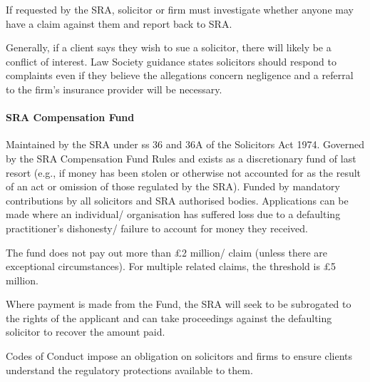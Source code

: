 \documentclass[
]{article}
\begin{document}
If requested by the SRA, solicitor or firm must investigate whether
anyone may have a claim against them and report back to SRA.

Generally, if a client says they wish to sue a solicitor, there will
likely be a conflict of interest. Law Society guidance states solicitors
should respond to complaints even if they believe the allegations
concern negligence and a referral to the firm's insurance provider will
be necessary.

\hypertarget{sra-compensation-fund}{%
\paragraph{SRA Compensation Fund}\label{sra-compensation-fund}}

Maintained by the SRA under ss 36 and 36A of the Solicitors Act 1974.
Governed by the SRA Compensation Fund Rules and exists as a
discretionary fund of last resort (e.g., if money has been stolen or
otherwise not accounted for as the result of an act or omission of those
regulated by the SRA). Funded by mandatory contributions by all
solicitors and SRA authorised bodies. Applications can be made where an
individual/ organisation has suffered loss due to a defaulting
practitioner's dishonesty/ failure to account for money they received.

The fund does not pay out more than £2 million/ claim (unless there are
exceptional circumstances). For multiple related claims, the threshold
is £5 million.

Where payment is made from the Fund, the SRA will seek to be subrogated
to the rights of the applicant and can take proceedings against the
defaulting solicitor to recover the amount paid.

Codes of Conduct impose an obligation on solicitors and firms to ensure
clients understand the regulatory protections available to them.
\end{document}

